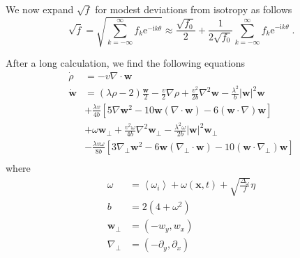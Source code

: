 \documentclass{article}
\begin{document}
We now expand $\sqrt{f}$ for modest deviations from isotropy as follows
\begin{equation}
    \sqrt{f}=\sqrt{\sum_{k=-\infty}^{\infty}{f_k}\mathrm{e}^{-\mathrm{i}k\theta}}\approx \frac{\sqrt{f_0}}{2}+\frac{1}{2\sqrt{f_0}}\sum_{k=-\infty}^{\infty}{f_k}\mathrm{e}^{-\mathrm{i}k\theta}\;.
\end{equation}

After a long calculation, we find the following equations
\begin{equation}
    \begin{aligned}
        \dot{\rho}&=-v\nabla \cdot \mathbf{w}\\
        \dot{\mathbf{w}}&=(\lambda \rho -2)\frac{\mathbf{w}}{2}-\frac{v}{2}\nabla \rho +\frac{v^2}{2b}\nabla ^2\mathbf{w}-\frac{\lambda ^2}{b}|\mathbf{w}|^2\mathbf{w}\\
        &+\frac{\lambda v}{4b}\left[ 5\nabla \mathbf{w}^2-10\mathbf{w}(\nabla \cdot \mathbf{w})-6(\mathbf{w}\cdot \nabla )\mathbf{w} \right]\\
        &+\omega \mathbf{w}_{\bot}+\frac{v^2\omega}{4b}\nabla ^2\mathbf{w}_{\bot}-\frac{\lambda ^2\omega}{2b}|\mathbf{w}|^2\mathbf{w}_{\bot}\\
        &-\frac{\lambda v\omega}{8b}\left[ 3\nabla _{\bot}\mathbf{w}^2-6\mathbf{w}\left( \nabla _{\bot}\cdot \mathbf{w} \right) -10\left( \mathbf{w}\cdot \nabla _{\bot} \right) \mathbf{w} \right]\\
    \end{aligned}
\end{equation}
where 
\begin{equation}
    \begin{aligned}
        \omega &=\left< \omega _i \right> +\omega \left( \mathbf{x},t \right) +\sqrt{\frac{\Delta _{\omega}}{f}}\eta\\
        b&=2\left( 4+\omega ^2 \right)\\
        \mathbf{w}_{\bot}&=\left( -w_y,w_x \right)\\
        \nabla _{\bot}&=\left( -\partial _y,\partial _x \right)\\
    \end{aligned}
\end{equation}
\end{document}
